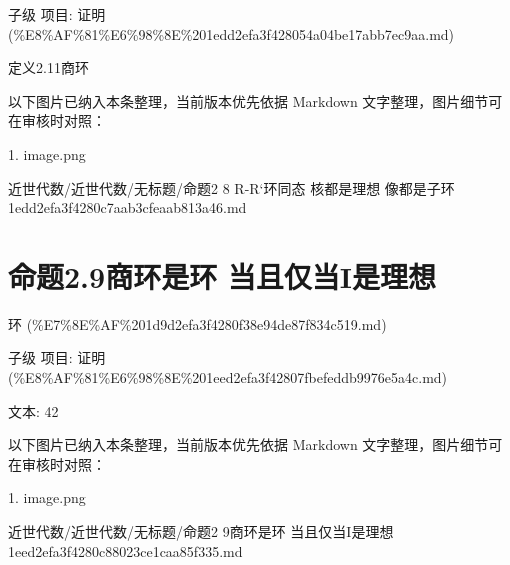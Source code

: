 \begin{proposition}

子级 项目: 证明 (\%E8\%AF\%81\%E6\%98\%8E\%201edd2efa3f428054a04be17abb7ec9aa.md)

定义2.11商环

\end{proposition}

\begin{note}[关联图片]
以下图片已纳入本条整理，当前版本优先依据 Markdown 文字整理，图片细节可在审核时对照：

1. image.png\\

\end{note}

\begin{note}[来源路径]

近世代数/近世代数/无标题/命题2 8 R-R‘环同态 核都是理想 像都是子环 1edd2efa3f4280c7aab3cfeaab813a46.md

\end{note}

\section*{命题2.9商环是环 当且仅当I是理想}

\begin{note}[来源上级主题]

环 (\%E7\%8E\%AF\%201d9d2efa3f4280f38e94de87f834c519.md)

\end{note}

\begin{proposition}

子级 项目: 证明 (\%E8\%AF\%81\%E6\%98\%8E\%201eed2efa3f42807fbefeddb9976e5a4c.md)

文本: 42

\end{proposition}

\begin{note}[关联图片]
以下图片已纳入本条整理，当前版本优先依据 Markdown 文字整理，图片细节可在审核时对照：

1. image.png\\

\end{note}

\begin{note}[来源路径]

近世代数/近世代数/无标题/命题2 9商环是环 当且仅当I是理想 1eed2efa3f4280c88023ce1caa85f335.md

\end{note}

